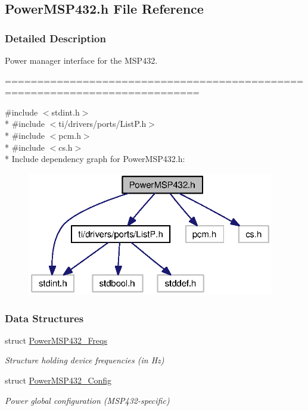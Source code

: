 \subsection{Power\+M\+S\+P432.\+h File Reference}
\label{_power_m_s_p432_8h}


\subsubsection{Detailed Description}
Power manager interface for the M\+S\+P432. 

============================================================================



{\ttfamily \#include $<$stdint.\+h$>$}\\*
{\ttfamily \#include $<$ti/drivers/ports/\+List\+P.\+h$>$}\\*
{\ttfamily \#include $<$pcm.\+h$>$}\\*
{\ttfamily \#include $<$cs.\+h$>$}\\*
Include dependency graph for Power\+M\+S\+P432.\+h\+:
\nopagebreak
\begin{figure}[H]
\begin{center}
\leavevmode
\includegraphics[width=306pt]{_power_m_s_p432_8h__incl}
\end{center}
\end{figure}
\subsubsection*{Data Structures}
\begin{DoxyCompactItemize}
\item 
struct \hyperlink{struct_power_m_s_p432___freqs}{Power\+M\+S\+P432\+\_\+\+Freqs}
\begin{DoxyCompactList}\small\item\em Structure holding device frequencies (in Hz) \end{DoxyCompactList}\item 
struct \hyperlink{struct_power_m_s_p432___config}{Power\+M\+S\+P432\+\_\+\+Config}
\begin{DoxyCompactList}\small\item\em Power global configuration (M\+S\+P432-\/specific) \end{DoxyCompactList}\end{DoxyCompactItemize}
